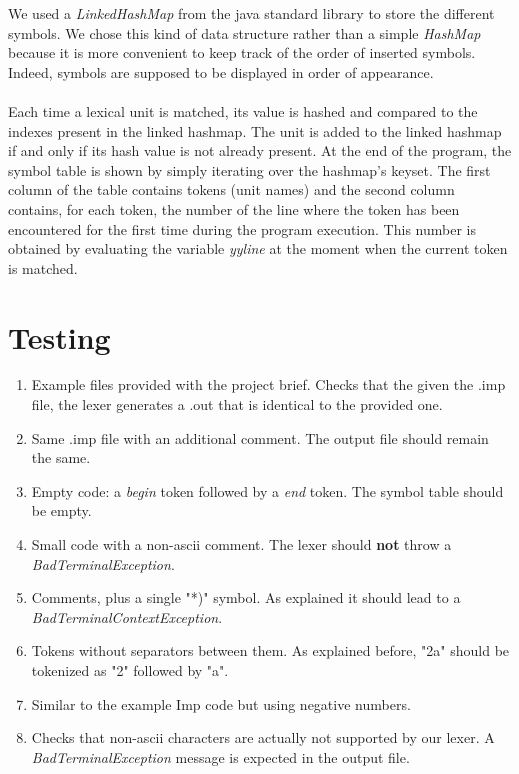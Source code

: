 \documentclass[12pt]{report}
\begin{document}
We used a \textit{LinkedHashMap} from the java standard library to store the different symbols. We chose this kind of data structure rather than
a simple \textit{HashMap} because it is more convenient to keep track of the order of inserted symbols. Indeed, symbols are supposed to be
displayed in order of appearance. \\ \\
Each time a lexical unit is matched, its value is hashed and compared to the indexes present in the linked hashmap. The unit is added to the linked hashmap 
if and only if its hash value is not already present. At the end of the program, the symbol table is shown by simply iterating over the hashmap's keyset. 
The first column of the table contains tokens (unit names) and the second column contains, for each token, the number of the line where the token has
been encountered for the first time during the program execution. This number is obtained by evaluating the variable \textit{yyline} at the moment when
the current token is matched.

\section{Testing}

\begin{enumerate}
\item Example files provided with the project brief. Checks that the given the .imp file, the lexer generates a .out that is identical to the provided one.
\item Same .imp file with an additional comment. The output file should remain the same.
\item Empty code: a \textit{begin} token followed by a \textit{end} token. The symbol table should be empty.
\item Small code with a non-ascii comment. The lexer should \textbf{not} throw a \textit{BadTerminalException}.
\item Comments, plus a single "*)" symbol. As explained it should lead to a \textit{BadTerminalContextException}.
\item Tokens without separators between them. As explained before, "2a" should be tokenized as "2" followed by "a".
\item Similar to the example Imp code but using negative numbers.
\item Checks that non-ascii characters are actually not supported by our lexer. A \textit{BadTerminalException} message is expected in the output file.
\end{enumerate}
\end{document}

